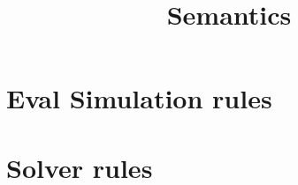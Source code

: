 \documentclass[]{article}
\title{Semantics}
\author{}
\begin{document}
\maketitle

\begin{abstract}

\end{abstract}

\section{Eval Simulation rules}


\section{Solver rules}

\end{document}
